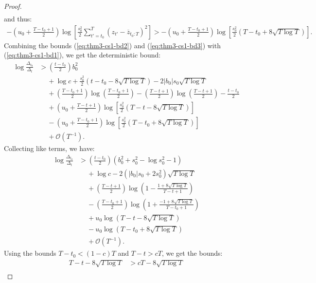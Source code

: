 \documentclass{article}
\begin{document}
\begin{proof}
\begin{align*}
\end{align*}
and thus:
\begin{align}
    -\left(u_0 + \frac{T - t_0 +1}{2}\right)\log\left[ \frac{s_0^2}{2}\sum_{t'=t_0}^T (z_{t'} - \overline{z}_{t_0:T})^2 \right]  > - \left(u_0 + \frac{T - t_0 +1}{2}\right)\log\left[ \frac{s_0^2}{2} \left(T - t_0 + 8\sqrt{T \log T}\right)\right]. \label{eq:thm3-cs1-bd3}
\end{align}
Combining the bounds (\ref{eq:thm3-cs1-bd2}) and (\ref{eq:thm3-cs1-bd3}) with (\ref{eq:thm3-cs1-bd1}), we get the deterministic bound:
\begin{align*}
    \log \frac{\Delta_{t_0}}{\Delta_t} &> \left(\frac{t-t_0}{2}\right)b_0^2\\
    &\quad\: + \log c + \frac{s_0^2}{2}\left(t - t_0 - 8 \sqrt{T\log T}\right) - 2 |b_0| s_0 \sqrt{T \log T} \\
    &\quad\: + \left(\frac{T - t_0 + 1}{2}\right) \log\left(\frac{T-t_0+1}{2}\right) - \left(\frac{T - t+1}{2}\right) \log\left(\frac{T-t+1}{2}\right) - \frac{t-t_0}{2} \\
    &\quad\: + \left(u_0 + \frac{T - t +1}{2}\right)\log\left[ \frac{s_0^2}{2} \left(T - t - 8\sqrt{T \log T}\right)\right] \\
    &\quad\: - \left(u_0 + \frac{T - t_0 +1}{2}\right)\log\left[\frac{s_0^2}{2}\left(T-t_0 + 8\sqrt{T \log T}\right) \right] \\
    &\quad\: + \mathcal{O}(T^{-1}).
\end{align*}
Collecting like terms, we have:
\begin{align*}
    \log \frac{\Delta_{t_0}}{\Delta_t} &> \left(\frac{t-t_0}{2}\right)(b_0^2 + s_0^2 - \log s_0^2 - 1) \\
    &\quad\: + \log c - 2 (|b_0|s_0 +2s_0^2) \sqrt{T \log T} \\
    &\quad\: + \left(\frac{T - t+1}{2}\right)\log\left(1 - \frac{1 + 8\sqrt{T \log T}}{T-t+1}\right)\\
    &\quad\: - \left(\frac{T - t_0+1}{2}\right)\log\left(1 + \frac{-1 + 8\sqrt{T \log T}}{T-t_0+1}\right)  \\
    &\quad\: + u_0\log\left(T - t - 8\sqrt{T \log T}\right) \\
    &\quad\: - u_0\log\left(T-t_0 + 8\sqrt{T \log T}\right) \\
    &\quad\: + \mathcal{O}(T^{-1}).
\end{align*}
Using the bounds $T - t_0 < (1-c)T$ and $T-t > cT$, we get the bounds:
\begin{align*}
    T-t - 8 \sqrt{T\log T} &> cT - 8 \sqrt{T\log T} \\

\end{align*}
\end{proof}
\end{document}
